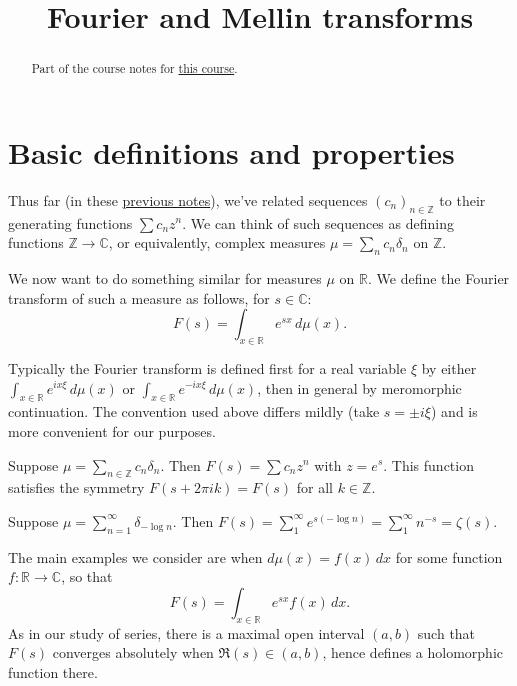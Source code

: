 \documentclass[reqno]{amsart} 
\begin{document}
 
\title{Fourier and Mellin transforms}

\begin{abstract}
  Part of the course notes for \href{2023-introduction-to-zeta-and-l-functions.pdf}{this course}.
\end{abstract}

\section{Basic definitions and properties}


Thus far (in these \href{20230907T142550--generating-functions-asymptotics.tex.pdf}{previous notes}), we've related sequences $(c_n)_{n \in \mathbb{Z}}$ to their generating functions $\sum c_n z^n$.  We can think of such sequences as defining functions $\mathbb{Z} \rightarrow \mathbb{C}$, or equivalently, complex measures $\mu = \sum_n c_n \delta_n$ on $\mathbb{Z}$.

We now want to do something similar for measures $\mu$ on $\mathbb{R}$. We define the Fourier transform of such a measure as follows, for $s \in \mathbb{C}$:
\begin{equation*}
  F(s) = \int_{x \in \mathbb{R} } e^{s x } \, d \mu (x).
\end{equation*}
\begin{remark}
  Typically the Fourier transform is defined first for a real variable $\xi$ by either $\int_{x \in \mathbb{R} } e^{i x \xi } \, d \mu(x)$ or $\int_{x \in \mathbb{R} } e^{-i x \xi } \, d \mu(x)$, then in general by meromorphic continuation.  The convention used above differs mildly (take $s = \pm i \xi$) and is more convenient for our purposes.
\end{remark}
\begin{example}
  Suppose $\mu = \sum_{n \in \mathbb{Z} } c_n \delta_n$.  Then $F (s) = \sum c_n z^n$ with $z = e^s$.  This function satisfies the symmetry $F (s + 2 \pi i k) = F (s)$ for all $k \in \mathbb{Z}$.
\end{example}
\begin{example}
  Suppose $\mu = \sum_{n =1 }^\infty \delta_{- \log n}$.  Then $F (s) = \sum_1^\infty e^{s (- \log n )} = \sum_1^\infty n^{- s} = \zeta(s)$.
\end{example}
The main examples we consider are when $d \mu (x) = f (x) \, d x$ for some function $f : \mathbb{R} \rightarrow \mathbb{C}$, so that
\begin{equation*}
  F (s) = \int_{x \in \mathbb{R} } e^{s x } f (x) \, d x.
\end{equation*}
As in our study of series, there is a maximal open interval $(a,b)$ such that $F (s)$ converges absolutely when $\Re(s) \in (a,b)$, hence defines a holomorphic function there.
\end{document}
